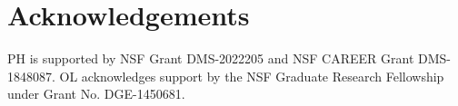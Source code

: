 \documentclass[11pt]{article}
\begin{document}
 \section*{Acknowledgements}
  PH is supported by NSF Grant DMS-2022205 and NSF CAREER Grant DMS-1848087. OL acknowledges support by the NSF Graduate Research Fellowship under Grant No. DGE-1450681.






\vskip2mm














          
\end{document}
